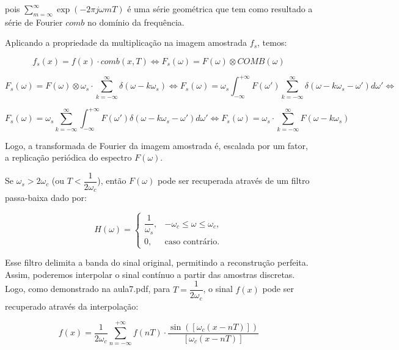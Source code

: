 \documentclass[]{abntex2}
\begin{document}
pois $\sum_{m=\infty}^{\infty} \exp(-2\pi j\omega mT)$ é uma série geométrica que tem como resultado a série de Fourier $comb$ no domínio da frequência.

Aplicando a propriedade da multiplicação na imagem amostrada \( f_s \), temos:

\begin{equation*}
    f_s(x) = f(x) \cdot comb(x, T) \Leftrightarrow F_s(\omega) = F(\omega) \otimes COMB(\omega)
\end{equation*}

\begin{equation*}
    F_s(\omega) = F(\omega) \otimes \omega_{s} \cdot \sum_{k=- \infty}^{\infty} \delta (\omega - k\omega_{s}) \Leftrightarrow F_s(\omega) = \omega_s \int_{-\infty}^{+\infty} F(\omega') \sum_{k=- \infty}^{\infty} \delta (\omega - k\omega_{s} - \omega') d\omega' \Leftrightarrow
\end{equation*}

\begin{equation*}
	F_s(\omega) = \omega_s \sum_{k=- \infty}^{\infty} \int_{-\infty}^{+\infty} F(\omega')  \delta (\omega - k\omega_{s} - \omega') d\omega' \Leftrightarrow F_s(\omega) = \omega_{s} \cdot \sum_{k=- \infty}^{\infty} F(\omega - k\omega_s)
\end{equation*}

Logo, a transformada de Fourier da imagem amostrada é, escalada por um fator, a replicação periódica do espectro \( F(\omega) \).

Se \( \omega_s > 2\omega_c \) (ou \( T < \dfrac{1}{2\omega_c} \)), então \( F(\omega) \) pode ser recuperada através de um filtro passa-baixa dado por:

\begin{equation}
    H(\omega) =
    \begin{cases}
        \dfrac{1}{\omega_s}, & -\omega_c \leq \omega \leq \omega_c, \\
        0, & \text{caso contrário.}
    \end{cases}
\end{equation}

Esse filtro delimita a banda do sinal original, permitindo a reconstrução perfeita. Assim, poderemos interpolar o sinal contínuo a partir das amostras discretas. Logo, como demonstrado na aula7.pdf, para \( T = \dfrac{1}{2\omega_c} \), o sinal \( f(x) \) pode ser recuperado através da interpolação:

\begin{equation*}
    f(x) = \dfrac{1}{2\omega_c}\sum_{n=-\infty}^{+\infty} f(nT) \cdot \frac{\sin\left( [\omega_c (x-nT)] \right)}{[\omega_c (x-nT)]}
\end{equation*}
\end{document}
